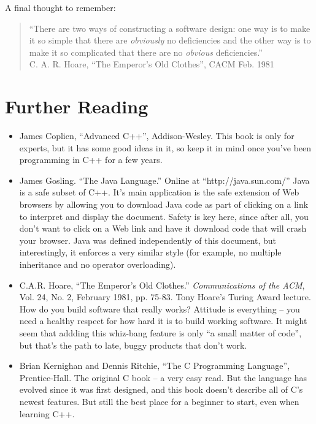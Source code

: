 A final thought to remember:

\begin{quote}
``There are two ways of constructing a software design: one way is to
make it so simple that there are {\em obviously} no deficiencies and
the other way is to make it so complicated that there are no {\em
obvious} deficiencies.'' \\ \hbox{} \hfill C. A. R. Hoare, ``The Emperor's
Old Clothes'', CACM Feb. 1981
\end{quote}

\section{Further Reading}

\begin{itemize}
\item[] James Coplien, ``Advanced C++'', Addison-Wesley.
This book is only for experts, but it has some good ideas in it,
so keep it in mind once you've been programming in C++ for a few years.

\item[] James Gosling.  ``The Java Language.''  Online at
``http://java.sun.com/''  Java is a safe subset of C++.  It's main
application is the safe extension of Web browsers by allowing
you to download Java code as part of clicking on a link to
interpret and display the document.  Safety is key here, since
after all, you don't want to click on a Web link and have
it download code that will crash your browser.  Java was defined
independently of this document, but interestingly, it enforces a
very similar style (for example, no multiple inheritance and
no operator overloading).

\item[] C.A.R. Hoare, ``The Emperor's Old Clothes.''
{\em Communications of the ACM}, Vol. 24, No. 2, February 1981,
pp. 75-83.  Tony Hoare's Turing Award lecture.  How do you build
software that really works?  Attitude is everything -- you need
a healthy respect for how hard it is to build working software.
It might seem that addding this whiz-bang feature is only
``a small matter of code'', but that's the path to late, buggy
products that don't work.

\item[] Brian Kernighan and Dennis Ritchie, ``The C Programming Language'',
Prentice-Hall.  The original C book -- a very easy read.  But the
language has evolved since it was first designed, and this book doesn't
describe all of C's newest features.  But still the best place for
a beginner to start, even when learning C++.


\end{itemize}
